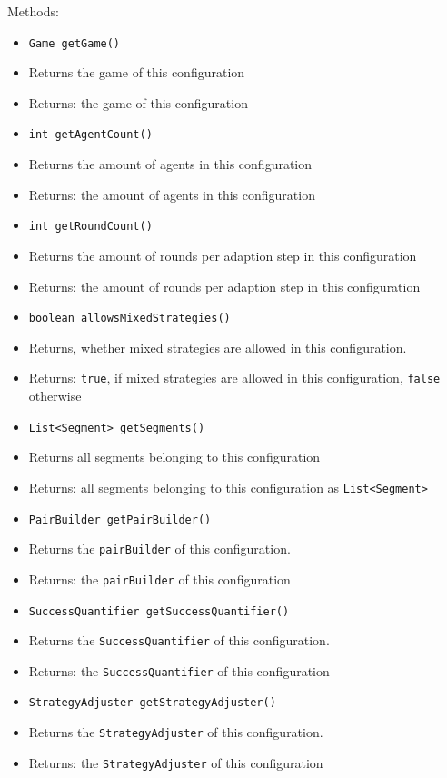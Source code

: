 \documentclass[parskip=full,11pt]{scrartcl}
\begin{document}
Methods:
\begin{itemize}\itemsep -10pt
\item \texttt{Game getGame()}
\item[] Returns the game of this configuration
\item[] Returns: the game of this configuration

\item \texttt{int getAgentCount()}
\item[] Returns the amount of agents in this configuration
\item[] Returns: the amount of agents in this configuration

\item \texttt{int getRoundCount()}
\item[] Returns the amount of rounds per adaption step in this configuration
\item[] Returns: the amount of rounds per adaption step in this configuration

\item \texttt{boolean allowsMixedStrategies()}
\item[] Returns, whether mixed strategies are allowed in this configuration.
\item[] Returns: \texttt{true}, if mixed strategies are allowed in this configuration, \texttt{false} otherwise

\item \texttt{List<Segment> getSegments()}
\item[] Returns all segments belonging to this configuration
\item[] Returns: all segments belonging to this configuration as \texttt{List<Segment>}

\item \texttt{PairBuilder getPairBuilder()}
\item[] Returns the \texttt{pairBuilder} of this configuration.
\item[] Returns: the \texttt{pairBuilder} of this configuration

\item \texttt{SuccessQuantifier getSuccessQuantifier()}
\item[] Returns the \texttt{SuccessQuantifier} of this configuration.
\item[] Returns: the \texttt{SuccessQuantifier} of this configuration

\item \texttt{StrategyAdjuster getStrategyAdjuster()}
\item[] Returns the \texttt{StrategyAdjuster} of this configuration.
\item[] Returns: the \texttt{StrategyAdjuster} of this configuration


\end{itemize}
\end{document}
